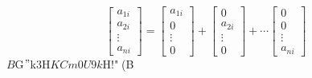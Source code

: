 \smallskip
$$\left[\begin{array}{c}a_{1i}\\a_{2i}\\ \vdots \\a_{ni}\end{array}\right] = 
\left[\begin{array}{c}a_{1i}\\0\\ \vdots \\0\end{array}\right] + 
\left[\begin{array}{c}0\\a_{2i}\\ \vdots \\0\end{array}\right] + \cdots
\left[\begin{array}{c}0\\0\\ \vdots \\a_{ni}\end{array}\right]$$
$B$G$"$k$3$H$KCm0U$9$k$H!"(B
